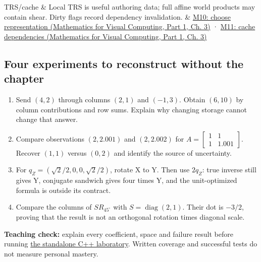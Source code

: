 {\begin{longtable}[]
TRS/cache & Local TRS is useful authoring data; full affine world products may contain shear. Dirty flags record dependency invalidation. & \href{../02-Mathematics-for-Visual-Computing-P01/main.pdf\#01-foundations-i-ch019-figure-m10---representation-follows-the-permitted-operation}{M10: choose representation (Mathematics for Visual Computing, Part 1, Ch. 3)} · \href{../02-Mathematics-for-Visual-Computing-P01/main.pdf\#01-foundations-i-ch019-figure-m11---invalidate-the-values-that-actually-depend-on-the-edit}{M11: cache dependencies (Mathematics for Visual Computing, Part 1, Ch. 3)} \\
\end{longtable}
}

\subsection{Four experiments to reconstruct without the chapter}\label{appendix-68f22c734be3-four-experiments-to-reconstruct-without-the-chapter}

\hypertarget{appendix-68f22c734be3-four-experiments-to-reconstruct-without-the-chapter}{}

\begin{enumerate}
\def\labelenumi{\arabic{enumi}.}
\tightlist
\item
  Send \((4,2)\) through columns \((2,1)\) and \((-1,3)\). Obtain \((6,10)\) by column contributions and row sums. Explain why changing storage cannot change that answer.
\item
  Compare observations \((2,2.001)\) and \((2,2.002)\) for \(A=\begin{bmatrix}1&1\\1&1.001\end{bmatrix}\). Recover \((1,1)\) versus \((0,2)\) and identify the source of uncertainty.
\item
  For \(q_Z=(\sqrt2/2,0,0,\sqrt2/2)\), rotate X to Y. Then use \(2q_Z\): true inverse still gives Y, conjugate sandwich gives four times Y, and the unit-optimized formula is outside its contract.
\item
  Compare the columns of \(S R_{45^\circ}\) with \(S=\operatorname{diag}(2,1)\). Their dot is \(-3/2\), proving that the result is not an orthogonal rotation times diagonal scale.
\end{enumerate}

\textbf{Teaching check:} explain every coefficient, space and failure result before running \hyperref[02-foundations-ii-ch038-a-complete-scalar-laboratory-makes-the-contracts-observable]{the standalone C++ laboratory}. Written coverage and successful tests do not measure personal mastery.

